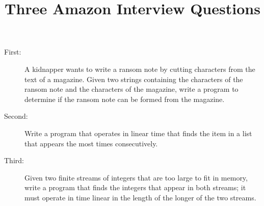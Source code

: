 \documentclass[12pt,a4paper]{article}
\title{Three Amazon Interview Questions}
\begin{document}
\maketitle
\begin{description}
\item[First: ] A kidnapper wants to write a ransom note by cutting characters from the text of a magazine. Given two strings containing the characters of the ransom note and the characters of the magazine, write a program to determine if the ransom note can be formed from the magazine.
\item[Second:] Write a program that operates in linear time that finds the item in a list that appears the most times consecutively.
\item[Third: ] Given two finite streams of integers that are too large to fit in memory, write a program that finds the integers that appear in both streams; it must operate in time linear in the length of the longer of the two streams.
\end{description}
\end{document}
